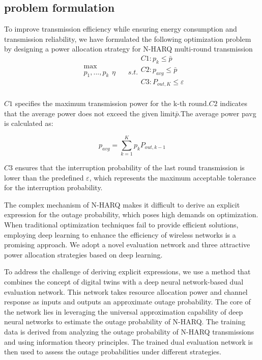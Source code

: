 \documentclass[runningheads]{llncs}
\begin{document}
\subsection{problem formulation}
To improve transmission efficiency while ensuring energy consumption and transmission reliability, we have formulated the following optimization problem by designing a power allocation strategy for N-HARQ multi-round transmission
$$
\ \ \begin{array}{c}
	\max\\
	p_1,...,p_k\\
\end{array}\eta \ \ \ \ \ \ \ \ s.t.\begin{array}{c}
	C1:p_k\le \bar{p}\\
	C2:p_{avg}\le \bar{p}\\
	C3:P_{out,K}\le \varepsilon\\
\end{array}
$$
\par
$C1$ specifies the maximum transmission power for the k-th round.$C2$  indicates that the average power does not exceed the given limit$\bar{p}$.The average power pavg is calculated as:
\par
$$
p_{avg}=\sum_{k=1}^K{p_kP_{out,k-1}}
$$
\par
$C3$ ensures that the interruption probability of the last round transmission is lower than the predefined $\varepsilon$, which represents the maximum acceptable tolerance for the interruption probability.
\par
The complex mechanism of N-HARQ makes it difficult to derive an explicit expression for the outage probability, which poses high demands on optimization. When traditional optimization techniques fail to provide efficient solutions, employing deep learning to enhance the efficiency of wireless networks is a promising approach. We adopt a novel evaluation network and three attractive power allocation strategies based on deep learning.
\par
To address the challenge of deriving explicit expressions, we use a method that combines the concept of digital twins with a deep neural network-based dual evaluation network. This network takes resource allocation power and channel response as inputs and outputs an approximate outage probability. The core of the network lies in leveraging the universal approximation capability of deep neural networks to estimate the outage probability of N-HARQ. The training data is derived from analyzing the outage probability of N-HARQ transmissions and using information theory principles. The trained dual evaluation network is then used to assess the outage probabilities under different strategies.
\end{document}
